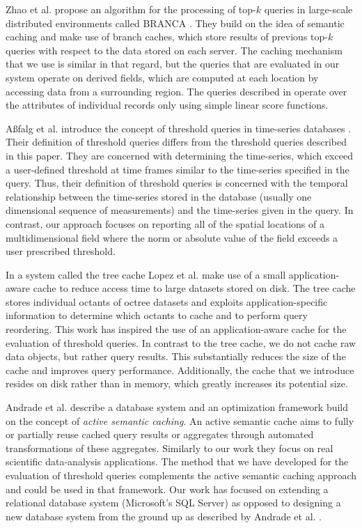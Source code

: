 \documentclass{sig-alternate}
\begin{document}
Zhao et al. propose an algorithm for the processing of top-$k$ queries in large-scale distributed environments called BRANCA \cite{Zhao}. They build on the 
idea of semantic caching \cite{Ren} and make use of branch caches, which store results of previous top-$k$ queries with respect to the data stored on each server.
The caching mechanism that we use is similar in that regard, but the queries that are evaluated in our system operate on derived fields, which are computed
at each location by accessing data from a surrounding region. The queries described in \cite{Zhao} operate over the attributes of individual records only using
simple linear score functions.

A{\ss}falg et al. introduce the concept of threshold queries in time-series databases \cite{Asfalg}. Their definition of threshold queries differs from the threshold
queries described in this paper. They are concerned with determining the time-series, which exceed a user-defined threshold at time frames similar to
the time-series specified in the query. Thus, their definition of threshold queries is concerned with the temporal relationship between the time-series
stored in the database (usually one dimensional sequence of measurements) and the time-series given in the query. In contrast, our approach focuses on
reporting all of the spatial locations of a multidimensional field where the norm or absolute value of the field exceeds a user prescribed threshold.

In a system called the tree cache Lopez et al. \cite{Lopez} make use of a small application-aware cache to reduce access time to large datasets stored on
disk. The tree cache stores individual octants of octree datasets and exploits application-specific information to determine which octants to cache and to 
perform query reordering. This work has inspired the use of an application-aware cache for the evaluation of threshold queries. In contrast to the tree cache,
we do not cache raw data objects, but rather query results. This substantially reduces the size of the cache and improves query performance. Additionally, 
the cache that we introduce resides on disk rather than in memory, which greatly increases its potential size.

Andrade et al. \cite{Andrade} describe a database system and an optimization framework build on the concept of \emph{active semantic caching}. An
active semantic cache aims to fully or partially reuse cached query results or aggregates through automated transformations of these aggregates. Similarly
to our work they focus on real scientific data-analysis applications. The method that we have developed for the evaluation of threshold queries complements
the active semantic caching approach and could be used in that framework. Our work has focused on extending a relational database system (Microsoft's SQL
Server) as opposed to designing a new database system from the ground up as described by Andrade et al. \cite{Andrade}.
\end{document}

